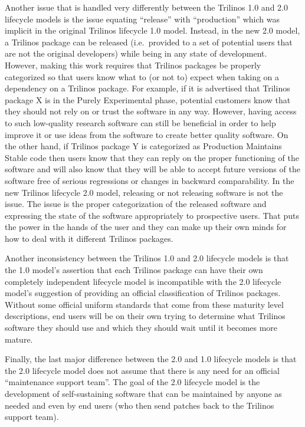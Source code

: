 \documentclass[11pt]{SANDreport}
\begin{document}
Another issue that is handled very differently between the Trilinos
1.0 and 2.0 lifecycle models is the issue equating ``release'' with
``production'' which was implicit in the original Trilinos lifecycle
1.0 model.  Instead, in the new 2.0 model, a Trilinos package can be
released (i.e.\ provided to a set of potential users that are not the
original developers) while being in any state of development.
However, making this work requires that Trilinos packages be properly
categorized so that users know what to (or not to) expect when taking
on a dependency on a Trilinos package.  For example, if it is
advertised that Trilinos package X is in the Purely Experimental
phase, potential customers know that they should not rely on or trust
the software in any way.  However, having access to such low-quality
research software can still be beneficial in order to help improve it
or use ideas from the software to create better quality software.  On
the other hand, if Trilinos package Y is categorized as Production
Maintains Stable code then users know that they can reply on the
proper functioning of the software and will also know that they will
be able to accept future versions of the software free of serious
regressions or changes in backward comparability.  In the new Trilinos
lifecycle 2.0 model, releasing or not releasing software is not the
issue.  The issue is the proper categorization of the released
software and expressing the state of the software appropriately to
prospective users.  That puts the power in the hands of the user and
they can make up their own minds for how to deal with it different
Trilinos packages.

Another inconsistency between the Trilinos 1.0 and 2.0 lifecycle
models is that the 1.0 model's assertion that each Trilinos package
can have their own completely independent lifecycle model is
incompatible with the 2.0 lifecycle model's suggestion of providing an
official classification of Trilinos packages.  Without some official
uniform standards that come from these maturity level descriptions, end
users will be on their own trying to determine what Trilinos software
they should use and which they should wait until it becomes more
mature.

Finally, the last major difference between the 2.0 and 1.0 lifecycle
models is that the 2.0 lifecycle model does not assume that there is
any need for an official ``maintenance support team''.  The goal of
the 2.0 lifecycle model is the development of self-sustaining software
that can be maintained by anyone as needed and even by end users (who
then send patches back to the Trilinos support team).
\end{document}
